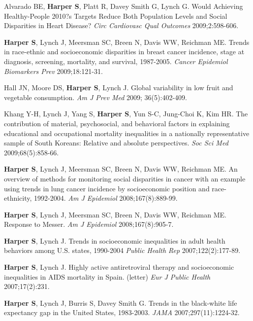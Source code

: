 \documentclass[
  letterpaper,
  DIV=11,
  numbers=noendperiod]{scrartcl}
\begin{document}
\begin{etaremune}
\item Alvarado BE, \textbf{Harper S}, Platt R, Davey Smith G, Lynch G. Would Achieving Healthy-People 2010?s Targets Reduce Both Population Levels and Social Disparities in Heart Disease? \emph{Circ Cardiovasc Qual Outcomes} 2009;2:598-606.
 
\item \textbf{Harper S}, Lynch J, Meersman SC, Breen N, Davis WW, Reichman ME.  Trends in race-ethnic and socioeconomic disparities in breast cancer incidence, stage at diagnosis, screening, mortality, and survival, 1987-2005.  \emph{Cancer Epidemiol Biomarkers Prev} 2009;18:121-31.
 
\item Hall JN, Moore DS, \textbf{Harper S}, Lynch J. Global variability in low fruit and vegetable consumption. \emph{Am J Prev Med} 2009; 36(5):402-409.
 
\item Khang Y-H, Lynch J, Yang S, \textbf{Harper S}, Yun S-C, Jung-Choi K, Kim HR.  The contribution of material, psychosocial, and behavioral factors in explaining educational and occupational mortality inequalities in a nationally representative sample of South Koreans: Relative and absolute perspectives.  \emph{Soc Sci Med} 2009;68(5):858-66.

\item \textbf{Harper S}, Lynch J, Meersman SC, Breen N, Davis WW, Reichman ME.  An overview of methods for monitoring social disparities in cancer with an example using trends in lung cancer incidence by socioeconomic position and race-ethnicity, 1992-2004.  \emph{Am J Epidemiol} 2008;167(8):889-99.
 
\item \textbf{Harper S}, Lynch J, Meersman SC, Breen N, Davis WW, Reichman ME.  Response to Messer. \emph{Am J Epidemiol} 2008;167(8):905-7.

\item \textbf{Harper S}, Lynch J. Trends in socioeconomic inequalities in adult health behaviors among U.S. states, 1990-2004  \emph{Public Health Rep} 2007;122(2):177-89.
 
\item \textbf{Harper S}, Lynch J. Highly active antiretroviral therapy and socioeconomic inequalities in AIDS mortality in Spain. (letter) \emph{Eur J Public Health} 2007;17(2):231.
 
\item \textbf{Harper S}, Lynch J, Burris S, Davey Smith G.  Trends in the black-white life expectancy gap in the United States, 1983-2003.  \emph{JAMA} 2007;297(11):1224-32.
 

\end{etaremune}
\end{document}
